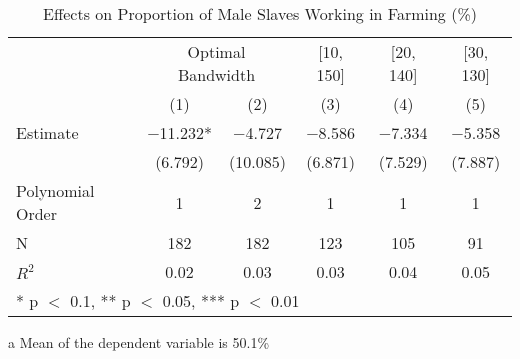 \begin{table}[!h]

\caption{Effects on Proportion of Male Slaves Working in Farming (\%) \label{tab:rdd_men_enslaved_farming}}
\centering
\begin{threeparttable}
\begin{tabular}[t]{lccccc}
\toprule
\multicolumn{1}{c}{} & \multicolumn{2}{c}{Optimal Bandwidth} & \multicolumn{1}{c}{[10, 150]} & \multicolumn{1}{c}{[20, 140]} & \multicolumn{1}{c}{[30, 130]} \\
\cmidrule(l{3pt}r{3pt}){2-3} \cmidrule(l{3pt}r{3pt}){4-4} \cmidrule(l{3pt}r{3pt}){5-5} \cmidrule(l{3pt}r{3pt}){6-6}
  & (1) & (2) & (3) & (4) & (5)\\
\midrule
Estimate & \num{-11.232}* & \num{-4.727} & \num{-8.586} & \num{-7.334} & \num{-5.358}\\
 & (\num{6.792}) & (\num{10.085}) & (\num{6.871}) & (\num{7.529}) & (\num{7.887})\\

\midrule
Polynomial Order & 1 & 2 & 1 & 1 & 1\\
N & \num{182} & \num{182} & \num{123} & \num{105} & \num{91}\\
$R^2$ & \num{0.02} & \num{0.03} & \num{0.03} & \num{0.04} & \num{0.05}\\
\bottomrule
\multicolumn{6}{l}{\rule{0pt}{1em}* p $<$ 0.1, ** p $<$ 0.05, *** p $<$ 0.01}\\
\end{tabular}
\begin{tablenotes}
\item[a] Mean of the dependent variable is 50.1\%
\end{tablenotes}
\end{threeparttable}
\end{table}
